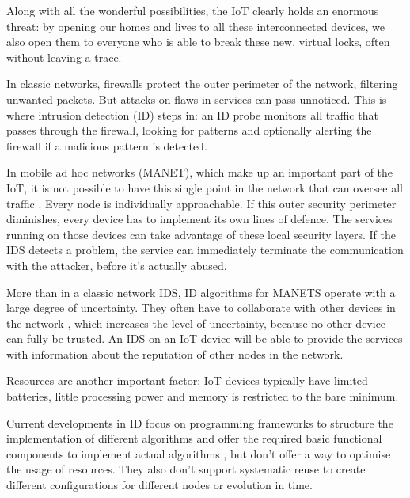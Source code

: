 \documentclass[conference]{IEEEtran}
\begin{document}
Along with all the wonderful possibilities, the IoT clearly holds an enormous
threat: by opening our homes and lives to all these interconnected devices, we
also open them to everyone who is able to break these new, virtual locks, often
without leaving a trace.


In classic networks, firewalls protect the outer perimeter of the network,
filtering unwanted packets. But attacks on flaws in services can pass
unnoticed. This is where intrusion detection (ID) steps in: an ID probe
monitors all traffic that passes through the firewall, looking for patterns and
optionally alerting the firewall if a malicious pattern is detected.


In mobile ad hoc networks (MANET), which make up an important part of the IoT,
it is not possible to have this single point in the network that can oversee
all traffic \cite{mishra2004intrusion}. Every node is individually
approachable. If this outer security perimeter diminishes, every device has to
implement its own lines of defence. The services running on those devices can
take advantage of these local security layers. If the IDS detects a problem,
the service can immediately terminate the communication with the attacker,
before it's actually abused.


More than in a classic network IDS, ID algorithms for MANETS operate with a
large degree of uncertainty. They often have to collaborate with other devices
in the network \cite{marchang2008collaborative,krontiris2009cooperative}, which
increases the level of uncertainty, because no other device can fully be
trusted. An IDS on an IoT device will be able to provide the services with
information about the reputation \cite{ganeriwal2008reputation} of other nodes
in the network.


Resources are another important factor: IoT devices typically have limited
batteries, little processing power and memory is restricted to the bare minimum.


Current developments in ID focus on programming frameworks to structure the
implementation of different algorithms \cite{valero2012di} and offer the
required basic functional components to implement actual algorithms
\cite{krontiris2008lidea}, but don't offer a way to optimise the usage of
resources. They also don't support systematic reuse to create different
configurations for different nodes or evolution in time.
\end{document}
